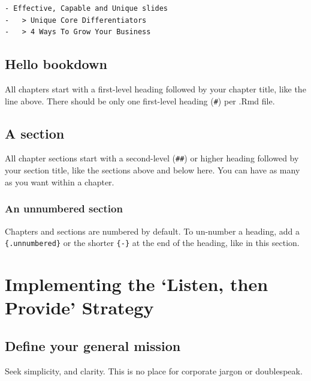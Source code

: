 \documentclass[
]{book}
\begin{document}
\begin{verbatim}
- Effective, Capable and Unique slides
-   > Unique Core Differentiators
-   > 4 Ways To Grow Your Business
\end{verbatim}

\hypertarget{hello-bookdown}{%
\section{Hello bookdown}\label{hello-bookdown}}

All chapters start with a first-level heading followed by your chapter title, like the line above. There should be only one first-level heading (\texttt{\#}) per .Rmd file.

\hypertarget{a-section}{%
\section{A section}\label{a-section}}

All chapter sections start with a second-level (\texttt{\#\#}) or higher heading followed by your section title, like the sections above and below here. You can have as many as you want within a chapter.

\hypertarget{an-unnumbered-section}{%
\subsection*{An unnumbered section}\label{an-unnumbered-section}}


Chapters and sections are numbered by default. To un-number a heading, add a \texttt{\{.unnumbered\}} or the shorter \texttt{\{-\}} at the end of the heading, like in this section.

\hypertarget{implementing-the-listen-then-provide-strategy}{%
\chapter{\texorpdfstring{Implementing the {`Listen, then Provide'} Strategy}{Implementing the `Listen, then Provide' Strategy}}\label{implementing-the-listen-then-provide-strategy}}

\hypertarget{define-your-general-mission}{%
\section{Define your general mission}\label{define-your-general-mission}}

Seek simplicity, and clarity. This is no place for corporate jargon or doublespeak.
\end{document}
